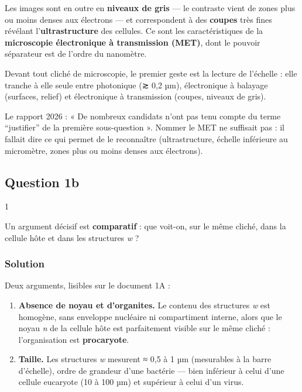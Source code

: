 \documentclass[11pt,a4paper]{article}
\providecommand{\tightlist}{\setlength{\itemsep}{0pt}\setlength{\parskip}{0pt}}
\begin{document}
Les images sont en outre en \textbf{niveaux de gris} --- le contraste vient de zones plus ou moins denses aux électrons --- et correspondent à des \textbf{coupes} très fines révélant l'\textbf{ultrastructure} des cellules. Ce sont les caractéristiques de la \textbf{microscopie électronique à transmission (MET)}, dont le pouvoir séparateur est de l'ordre du nanomètre.

\begin{methode}

Devant tout cliché de microscopie, le premier geste est la lecture de l'échelle : elle tranche à elle seule entre photonique (≳ 0,2 µm), électronique à balayage (surfaces, relief) et électronique à transmission (coupes, niveaux de gris).

\end{methode}

\begin{jury}

Le rapport 2026 : « De nombreux candidats n'ont pas tenu compte du terme ``justifier'' de la première sous-question ». Nommer le MET ne suffisait pas : il fallait dire ce qui permet de le reconnaître (ultrastructure, échelle inférieure au micromètre, zones plus ou moins denses aux électrons).

\end{jury}

\hypertarget{question-1b}{%
\subsection{Question 1b}\label{question-1b}}

\begin{indication}{1}

Un argument décisif est \textbf{comparatif} : que voit-on, sur le même cliché, dans la cellule hôte et dans les structures \emph{w} ?

\end{indication}

\hypertarget{solution-42}{%
\subsubsection{Solution}\label{solution-42}}

Deux arguments, lisibles sur le document 1A :

\begin{enumerate}
\def\labelenumi{\arabic{enumi}.}
\tightlist
\item
  \textbf{Absence de noyau et d'organites.} Le contenu des structures \emph{w} est homogène, sans enveloppe nucléaire ni compartiment interne, alors que le noyau \emph{n} de la cellule hôte est parfaitement visible sur le même cliché : l'organisation est \textbf{procaryote}.
\item
  \textbf{Taille.} Les structures \emph{w} mesurent ≈ 0,5 à 1 µm (mesurables à la barre d'échelle), ordre de grandeur d'une bactérie --- bien inférieur à celui d'une cellule eucaryote (10 à 100 µm) et supérieur à celui d'un virus.
\end{enumerate}
\end{document}
